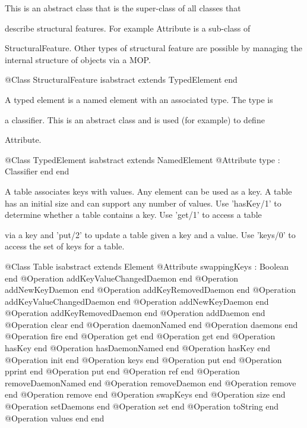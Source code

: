       This is an abstract class that is the super-class of all classes that

      describe structural features. For example Attribute is a sub-class of

      StructuralFeature. Other types of structural feature are possible by 
      managing the internal structure of objects via a MOP.
\begin{Interface}
@Class StructuralFeature isabstract extends TypedElement
end
\end{Interface}

      A typed element is a named element with an associated type. The type is

      a classifier. This is an abstract class and is used (for example) to define

      Attribute.
\begin{Interface}
@Class TypedElement isabstract extends NamedElement
  @Attribute type : Classifier end
end
\end{Interface}

      A table associates keys with values. Any element can be used as a key.
      A table has an initial size and can support any number of values. Use 'hasKey/1'
      to determine whether a table contains a key. Use 'get/1' to access a table

      via a key and 'put/2' to update a table given a key and a value. Use 'keys/0'
      to access the set of keys for a table.
\begin{Interface}
@Class Table isabstract extends Element
  @Attribute swappingKeys : Boolean end
  @Operation addKeyValueChangedDaemon end
  @Operation addNewKeyDaemon end
  @Operation addKeyRemovedDaemon end
  @Operation addKeyValueChangedDaemon end
  @Operation addNewKeyDaemon end
  @Operation addKeyRemovedDaemon end
  @Operation addDaemon end
  @Operation clear end
  @Operation daemonNamed end
  @Operation daemons end
  @Operation fire end
  @Operation get end
  @Operation get end
  @Operation hasKey end
  @Operation hasDaemonNamed end
  @Operation hasKey end
  @Operation init end
  @Operation keys end
  @Operation put end
  @Operation pprint end
  @Operation put end
  @Operation ref end
  @Operation removeDaemonNamed end
  @Operation removeDaemon end
  @Operation remove end
  @Operation remove end
  @Operation swapKeys end
  @Operation size end
  @Operation setDaemons end
  @Operation set end
  @Operation toString end
  @Operation values end
end
\end{Interface}

